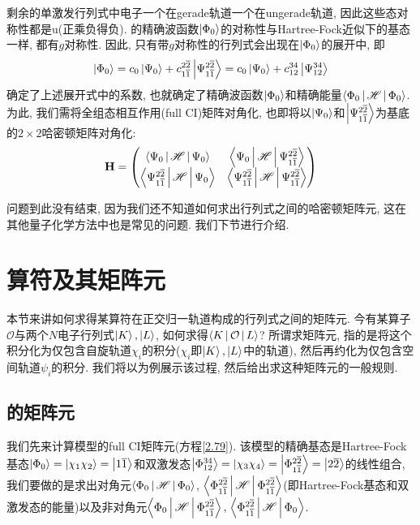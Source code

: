 剩余的单激发行列式中电子一个在gerade轨道一个在ungerade轨道, 
因此这些态对称性都是u(正乘负得负). 
的精确波函数$\Ket{\Phi_0}$的对称性与Hartree-Fock近似下的基态一样, 
都有$g$对称性. 
因此, 
只有带$g$对称性的行列式会出现在$\Ket{\Phi_0}$的展开中, 
即
\begin{equation}
\Ket{\Phi_0}=c_0\Ket{\Psi_0} + c_{1\overline{1}}^{2\overline{2}}\Ket{\Psi_{1\overline{1}}^{2\overline{2}}}=c_0\Ket{\Psi_0} + c_{12}^{34}\Ket{\Psi_{12}^{34}}
\end{equation}
确定了上述展开式中的系数, 
也就确定了精确波函数$\Ket{\Phi_0}$和精确能量$\Braket{\Phi_0|\mathscr{H}|\Phi_0}$. 
为此, 
我们需将全组态相互作用(full CI)矩阵对角化, 
也即将以$\Ket{\Psi_0}$和$\Ket{\Psi_{1\overline{1}}^{2\overline{2}}}$为基底的$2\times 2$哈密顿矩阵对角化:
\begin{equation}
	\label{2.79}
	\mathbf{H}=
	\begin{pmatrix}
		\Braket{{\Psi_0}|\mathscr{H} | {\Psi_0}} & \Braket{{\Psi_0} |\mathscr{H} |{\Psi_{1\overline{1}}^{2\overline{2}}}}\\
		\Braket{{\Psi_{1\overline{1}}^{2\overline{2}}}|\mathscr{H} | {\Psi_0}} & \Braket{{\Psi_{1\overline{1}}^{2\overline{2}}} |\mathscr{H} |{\Psi_{1\overline{1}}^{2\overline{2}}}}
	\end{pmatrix}
\end{equation}

问题到此没有结束, 
因为我们还不知道如何求出行列式之间的哈密顿矩阵元, 
这在其他量子化学方法中也是常见的问题. 
我们下节进行介绍.


\section{算符及其矩阵元 }
 \label{sec2.3}
本节来讲如何求得某算符在正交归一轨道构成的行列式之间的矩阵元. 
今有某算子$\mathcal{O}$与两个$N$电子行列式$\Ket{K},\Ket{L}$, 
如何求得$\Braket{K|\mathcal{O}|L}$? 所谓求矩阵元, 
指的是将这个积分化为仅包含自旋轨道$\chi_i$的积分($\chi_i$即$\Ket{K},\Ket{L}$中的轨道), 
然后再约化为仅包含空间轨道$\psi_i$的积分. 
 我们将以为例展示该过程, 
然后给出求这种矩阵元的一般规则.


\subsection{的矩阵元}
 \label{sec2.3.1}
我们先来计算模型的full CI矩阵元(方程\ref{2.79}). 
该模型的精确基态是Hartree-Fock基态$\Ket{\Phi_0}=\Ket{\chi_1\chi_2}=\Ket{1\overline{1}}$和双激发态$\Ket{\Phi_{12}^{34}}=\Ket{\chi_3\chi_4}=\Ket{\Phi_{1\overline{1}}^{2\overline{2}}}=\Ket{2\overline{2}}$的线性组合, 
我们要做的是求出对角元$\Braket{{\Phi_0}|\mathscr{H} | {\Phi_0}}$, 
$\Braket{{\Phi_{1\overline{1}}^{2\overline{2}}} |\mathscr{H} |{\Phi_{1\overline{1}}^{2\overline{2}}}}$(即Hartree-Fock基态和双激发态的能量)以及非对角元$\Braket{{\Phi_0} |\mathscr{H} |{\Phi_{1\overline{1}}^{2\overline{2}}}},$$\,\Braket{{\Phi_{1\overline{1}}^{2\overline{2}}}|\mathscr{H} | {\Phi_0}}$.


